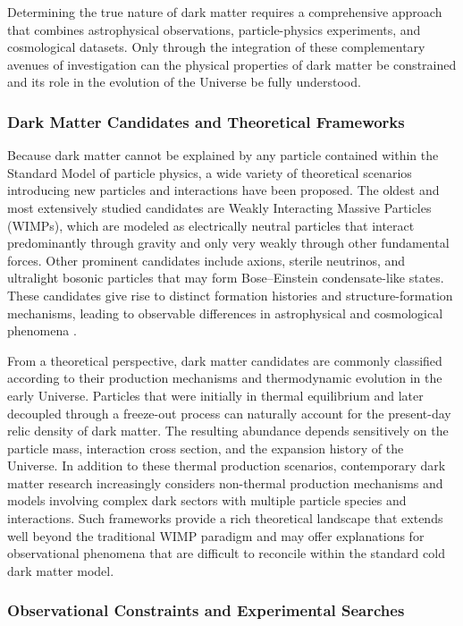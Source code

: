 Determining the true nature of dark matter requires a comprehensive approach that combines astrophysical observations, particle-physics experiments, and cosmological datasets. Only through the integration of these complementary avenues of investigation can the physical properties of dark matter be constrained and its role in the evolution of the Universe be fully understood.

\subsubsection{Dark Matter Candidates and Theoretical Frameworks}

Because dark matter cannot be explained by any particle contained within the Standard Model of particle physics, a wide variety of theoretical scenarios introducing new particles and interactions have been proposed. The oldest and most extensively studied candidates are Weakly Interacting Massive Particles (WIMPs), which are modeled as electrically neutral particles that interact predominantly through gravity and only very weakly through other fundamental forces. Other prominent candidates include axions, sterile neutrinos, and ultralight bosonic particles that may form Bose--Einstein condensate-like states. These candidates give rise to distinct formation histories and structure-formation mechanisms, leading to observable differences in astrophysical and cosmological phenomena \cite{rubakov2014}.

From a theoretical perspective, dark matter candidates are commonly classified according to their production mechanisms and thermodynamic evolution in the early Universe. Particles that were initially in thermal equilibrium and later decoupled through a freeze-out process can naturally account for the present-day relic density of dark matter. The resulting abundance depends sensitively on the particle mass, interaction cross section, and the expansion history of the Universe. In addition to these thermal production scenarios, contemporary dark matter research increasingly considers non-thermal production mechanisms and models involving complex dark sectors with multiple particle species and interactions. Such frameworks provide a rich theoretical landscape that extends well beyond the traditional WIMP paradigm and may offer explanations for observational phenomena that are difficult to reconcile within the standard cold dark matter model.

\subsubsection{Observational Constraints and Experimental Searches}


